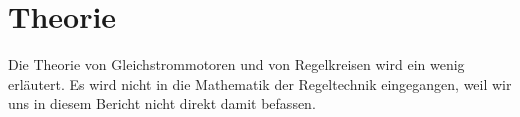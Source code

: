 \section{Theorie}

Die  Theorie  von  Gleichstrommotoren  und  von  Regelkreisen wird  ein  wenig
erl\"autert.  Es wird nicht in die Mathematik  der  Regeltechnik  eingegangen,
weil wir uns in diesem Bericht nicht direkt damit befassen.




